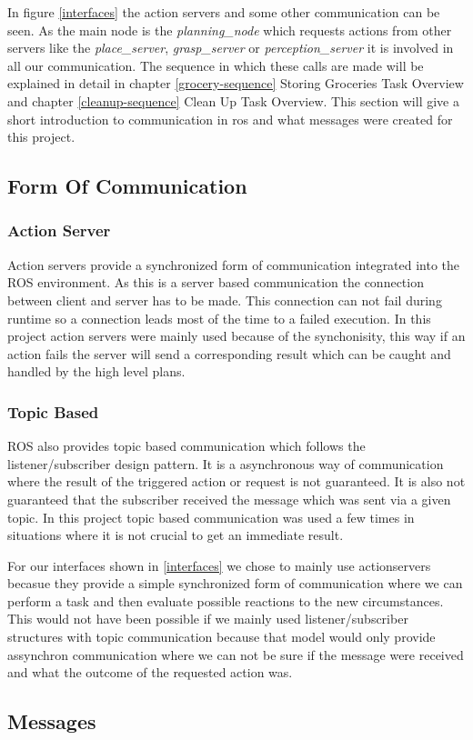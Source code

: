 \documentclass[main.tex]{subfiles}
\begin{document}
		In figure \ref{interfaces} the action servers and some other communication can be seen. As the main node is the \textit{planning\_node} which requests actions from other servers like the \textit{place\_server}, \textit{grasp\_server} or \textit{perception\_server} it is involved in all our communication. The sequence in which these calls are made will be explained in detail in chapter \ref{grocery-sequence} Storing Groceries Task Overview and chapter \ref{cleanup-sequence} Clean Up Task Overview. This section will give a short introduction to communication in ros and what messages were created for this project.

		\subsection{Form Of Communication}
		
			\subsubsection{Action Server}
			
			Action servers provide a synchronized form of communication integrated into the ROS environment. As this is a server based communication the connection between client and server has to be made. This connection can not fail during runtime so a connection leads most of the time to a failed execution. In this project action servers were mainly used because of the synchonisity, this way if an action fails the server will send a corresponding result which can be caught and handled by the high level plans.
			
			\subsubsection{Topic Based}
			
			ROS also provides topic based communication which follows the listener/subscriber design pattern. It is a asynchronous way of communication where the result of the triggered action or request is not guaranteed. It is also not guaranteed that the subscriber received the message which was sent via a given topic. In this project topic based communication was used a few times in situations where it is not crucial to get an immediate result.  
		

		For our interfaces shown in \ref{interfaces} we chose to mainly use actionservers becasue they provide a simple synchronized form of communication where we can perform a task and then evaluate possible reactions to the new circumstances. This would not have been possible if we mainly used listener/subscriber structures with topic communication because that model would only provide assynchron communication where we can not be sure if the message were received and what the outcome of the requested action was.

		\subsection{Messages}


		
	  		 

	\endgroup
\end{document}
